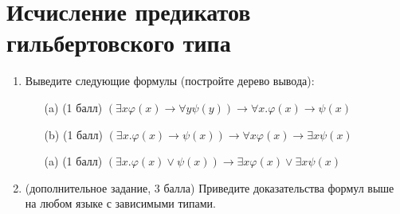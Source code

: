 \section{Исчисление предикатов гильбертовского типа}
\begin{enumerate}
  \item Выведите следующие формулы (постройте дерево вывода):
  \begin{itemize}
    \item[(a)] (1 балл) $(\exists x\varphi (x) \rightarrow  \forall y\psi (y)) \rightarrow  \forall x. \varphi (x) \rightarrow  \psi (x)$
    \item[(b)] (1 балл) $(\exists x. \varphi (x) \rightarrow  \psi (x)) \rightarrow  \forall x\varphi (x) \rightarrow  \exists x\psi (x)$
    \item[(a)] (1 балл) $(\exists x. \varphi (x) \lor  \psi (x)) \rightarrow  \exists x\varphi (x) \lor  \exists x\psi (x)$
  \end{itemize}
    \item (дополнительное задание, 3 балла) Приведите доказательства формул выше на любом
    языке с зависимыми типами.
\end{enumerate}
\clearpage

